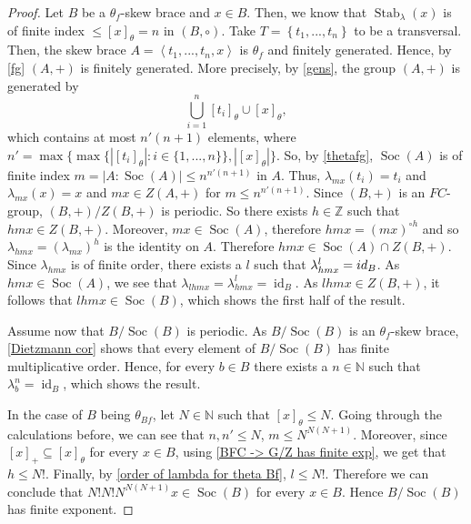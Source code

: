 \documentclass[10pt,a4paper]{amsart}
\newcommand{\N}{\mathbb{N}}
\newcommand{\Soc}{\operatorname{Soc}}
\newcommand{\Stab}{\operatorname{Stab}}
\newcommand{\Z}{\mathbb{Z}}
\newcommand{\id}{\operatorname{id}}
\begin{document}
\begin{proof}
Let $B$ be a $\theta_f$-skew brace and  $x \in B$.
Then, we know that $\Stab_{\lambda}(x) $ is 
of finite index $\leq [x]_\theta=n$
in $(B,\circ)$.
Take $T=\left\lbrace t_1,..., t_n \right\rbrace$ to be a transversal. 
Then, the skew brace $A=\left<t_1,...,t_n,x\right>$ is $\theta_f$ and finitely generated. 
Hence, by \cref{fg} $(A,+)$ is finitely generated. 
More precisely, by \cref{gens}, 
the group $(A,+)$ is generated by 
\[
\bigcup_{i=1}^n\left\lbrack t_i\right\rbrack_{\theta} \cup [x]_{\theta},
\]
which contains at most $n'(n+1)$ elements, 
where $n'=\max\{\max\{|[t_i]_\theta|:i\in \{1,...,n\}\},|[x]_\theta|\}$.
So, by \cref{thetafg},
$\Soc(A)$ is of finite index $m=|A:\Soc(A)|\leq n^{n'(n+1)}$ in $A$.
Thus, $\lambda_{mx}(t_i) = t_i$ and $\lambda_{mx}(x) =x$ and $mx \in Z(A,+)$ for $m\leq n^{n'(n+1)}$.
Since $(B,+)$ is an $FC$-group,
$(B,+)/Z(B,+)$ is periodic.
So  there exists $h\in \Z$ such that $hmx\in Z(B,+)$.
Moreover, $mx\in\Soc(A)$, therefore 
$hmx=(mx)^{\circ h}$ and so 
$\lambda_{hmx}=(\lambda_{mx})^h$
is the identity on $A$.
Therefore $hmx\in \Soc(A)\cap Z(B,+)$.
Since $\lambda_{hmx}$ is of finite order,
there exists a $l$ such that $\lambda_{hmx}^l=\textup{id}_B$.
As $hmx\in \Soc(A)$, we see that $\lambda_{lhmx}=\lambda_{hmx}^l=\id_B$.
As $lhmx \in Z(B,+)$, it follows that $lhmx \in \Soc(B)$, which shows the first half of the result. 

Assume now that $B/\Soc(B)$ is periodic. As $B/\Soc(B)$ is an $\theta_f$-skew brace, \cref{Dietzmann cor} shows that every element of $B/\Soc(B)$ has finite multiplicative order. 
Hence, for every $b \in B$ there exists a $n\in \N$ such that $\lambda_b^n=\id_B$, which shows the result.

In the case of $B$ being $\theta_{Bf}$,
let $N\in \N$ such that $[x]_\theta\leq N$.
Going through the calculations before,
we can see that $n,n'\leq N$, $m\leq N^{N(N+1)}$.
Moreover, since $[x]_+\subseteq [x]_\theta$ for every $x\in B$,
using \cref{BFC -> G/Z has finite exp}, we get that $h\leq N!$.
Finally, by \cref{order of lambda for theta Bf}, $ l\leq N!$.
Therefore we can conclude that $N! N!  N^{N(N+1)} x\in\Soc(B)$
for every $x\in B$.
Hence $B/\Soc(B)$ has finite exponent.
\end{proof}
\end{document}
